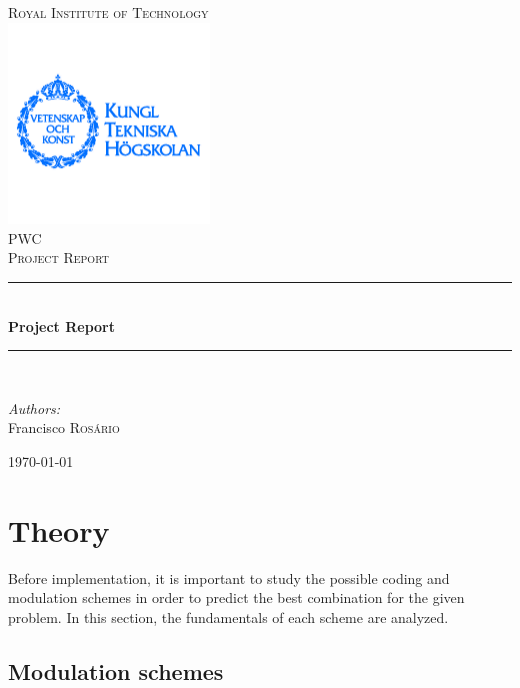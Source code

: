 \documentclass[12pt,a4paper,openright]{article}
\newcommand{\HRule}{\rule{\linewidth}{0.5mm}}
\begin{document}
\begin{titlepage}
\begin{center}
\textsc{\LARGE Royal Institute of Technology}\\[0.3cm]
\includegraphics[width=0.4\textwidth]{./logo}~\\[0.3cm]


\textsc{\Large PWC \\ Project Report}\\[0.5cm]

\HRule \\[0.4cm]
{ \huge \bfseries Project Report \\[0.4cm] }

\HRule \\[1.5cm]

\begin{minipage}{0.4\textwidth}
\begin{flushleft} \large
\emph{Authors:}\\

Francisco \textsc{Rosário}
\end{flushleft}
\end{minipage}
\vfill
{\large \today}



\end{center}
\end{titlepage}


\section{Theory}
Before implementation, it is important to study the possible coding and modulation schemes in order to predict the best combination for the given problem. In this section, the fundamentals of each scheme are analyzed.
\subsection{Modulation schemes}
\end{document}
